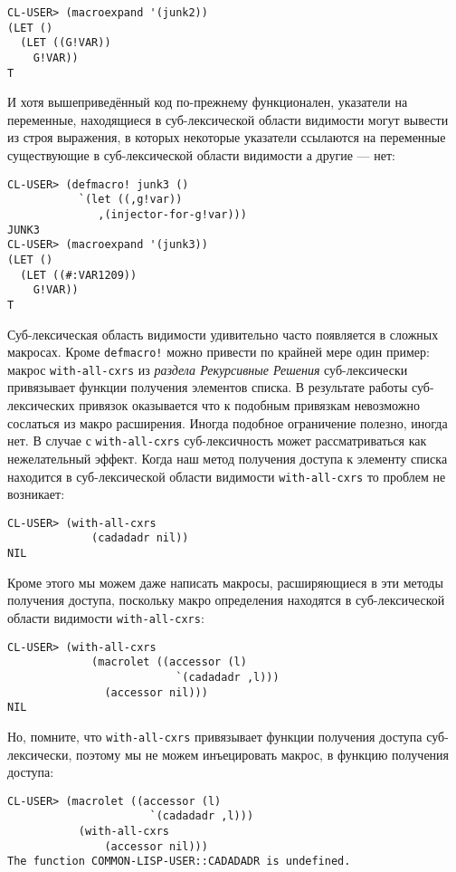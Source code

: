 \begin{verbatim}
CL-USER> (macroexpand '(junk2))
(LET ()
  (LET ((G!VAR))
    G!VAR))
T
\end{verbatim}

И хотя вышеприведённый код по-прежнему функционален, указатели на переменные, находящиеся в суб-лексической области видимости могут вывести из строя выражения, в которых некоторые указатели ссылаются на переменные существующие в суб-лексической области видимости а другие --- нет:

\begin{verbatim}
CL-USER> (defmacro! junk3 ()
           `(let ((,g!var))
              ,(injector-for-g!var)))
JUNK3
CL-USER> (macroexpand '(junk3))
(LET ()
  (LET ((#:VAR1209))
    G!VAR))
T
\end{verbatim}

Суб-лексическая область видимости удивительно часто появляется в сложных макросах. Кроме \verb"defmacro!" можно привести по крайней мере один пример: макрос \verb"with-all-cxrs" из \emph{раздела Рекурсивные Решения} суб-лексически привязывает функции получения элементов списка. В результате работы суб-лексических привязок оказывается что к подобным привязкам невозможно сослаться из макро расширения. Иногда подобное ограничение полезно, иногда нет. В случае с \verb"with-all-cxrs" суб-лексичность может рассматриваться как нежелательный эффект. Когда наш метод получения доступа к элементу списка находится в суб-лексической области видимости \verb"with-all-cxrs" то проблем не возникает:

\begin{verbatim}
CL-USER> (with-all-cxrs
             (cadadadr nil))
NIL
\end{verbatim}

Кроме этого мы можем даже написать макросы, расширяющиеся в эти методы получения доступа, поскольку макро определения находятся в суб-лексической области видимости \verb"with-all-cxrs":

\begin{verbatim}
CL-USER> (with-all-cxrs
             (macrolet ((accessor (l)
                          `(cadadadr ,l)))
               (accessor nil)))
NIL
\end{verbatim}

Но, помните, что \verb"with-all-cxrs" привязывает функции получения доступа суб-лексически, поэтому мы не можем инъецировать макрос, в функцию получения доступа:

\begin{verbatim}
CL-USER> (macrolet ((accessor (l)
                      `(cadadadr ,l)))
           (with-all-cxrs
               (accessor nil)))
The function COMMON-LISP-USER::CADADADR is undefined.
\end{verbatim}

